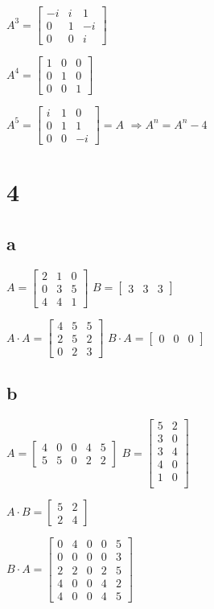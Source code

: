 \documentclass{article}
\begin{document}
$A^3=\begin{bmatrix}
    -i&i&1\\
    0&1&-i\\
    0&0&i
\end{bmatrix}$


$A^4=\begin{bmatrix}
    1&0&0\\
    0&1&0\\
    0&0&1
\end{bmatrix}$

$A^5=\begin{bmatrix}
    i&1&0\\
    0&1&1\\
    0&0&-i
\end{bmatrix}=A$
$\Rightarrow A^n=A^n-4$

\section*{4}
\subsection*{a}
$A = \begin{bmatrix}
    2&1&0\\
    0&3&5\\
    4&4&1
\end{bmatrix}$
$B = \begin{bmatrix}
    3&3&3
\end{bmatrix}$

$A\cdot A = \begin{bmatrix}
    4&5&5\\
    2&5&2\\
    0&2&3
\end{bmatrix}$
$B\cdot A = \begin{bmatrix}
    0&0&0
\end{bmatrix}$
\subsection*{b}
$A = \begin{bmatrix}
    4&0&0&4&5\\
    5&5&0&2&2
\end{bmatrix}$
$B = \begin{bmatrix}
    5&2\\
    3&0\\
    3&4\\
    4&0\\
    1&0\\
\end{bmatrix}$


$A\cdot B = \begin{bmatrix}
    5&2\\
    2&4
\end{bmatrix}$

$B\cdot A = \begin{bmatrix}
    0&4&0&0&5\\
    0&0&0&0&3\\
    2&2&0&2&5\\
    4&0&0&4&2\\
    4&0&0&4&5
\end{bmatrix}$
\end{document}
